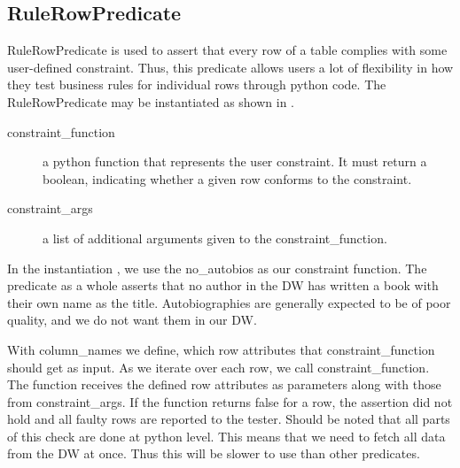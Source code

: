 \subsection{RuleRowPredicate}\label{RCP}
RuleRowPredicate is used to assert that every row of a table complies with some user-defined constraint. Thus, this predicate allows users a lot of flexibility in how they test business rules for individual rows through python code. The RuleRowPredicate may be instantiated as shown in .


\begin{description}
\item [constraint\_function] a python function that represents the user constraint. It must return a boolean, indicating whether a given row conforms to the constraint.
\item [constraint\_args] a list of additional arguments given to the constraint\_function.
\end{description}

In the instantiation , we use the no\_autobios as our constraint function. The predicate as a whole asserts that no author in the DW has written a book with their own name as the title. Autobiographies are generally expected to be of poor quality, and we do not want them in our DW. 

With column\_names we define, which row attributes that constraint\_function should get as input. As we iterate over each row, we call constraint\_function. The function receives the defined row attributes as parameters along with those from constraint\_args. If the function returns false for a row, the assertion did not hold and all faulty rows are reported to the tester. Should be noted that all parts of this check are done at python level. This means that we need to fetch all data from the DW at once. Thus this will be slower to use than other predicates.
